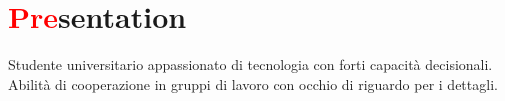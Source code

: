 \section*{\textcolor{red}{Pre}sentation}
Studente universitario appassionato di tecnologia con forti capacità decisionali.\newline
Abilità di cooperazione in gruppi di lavoro con occhio di riguardo per i dettagli.